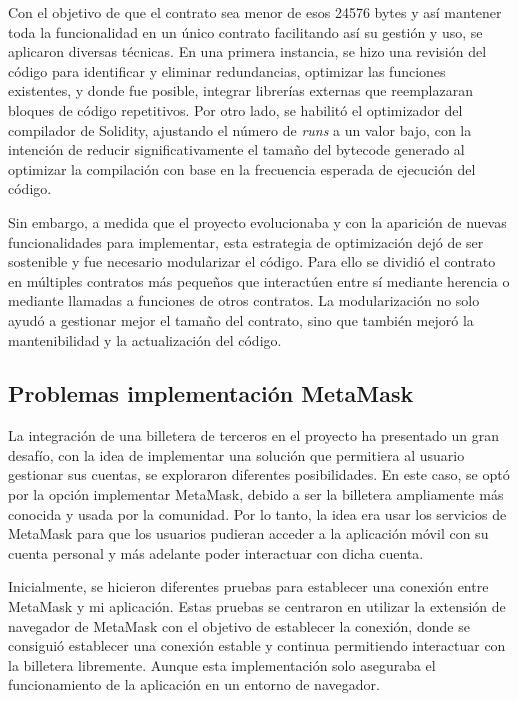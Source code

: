 Con el objetivo de que el contrato sea menor de esos 24576 bytes y así mantener toda la funcionalidad en un único contrato facilitando así su gestión y uso, se aplicaron diversas técnicas.
En una primera instancia, se hizo una revisión del código para identificar y eliminar redundancias, optimizar las funciones existentes, y donde fue posible, integrar librerías externas que reemplazaran bloques de código repetitivos.
Por otro lado, se habilitó el optimizador del compilador de Solidity, ajustando el número de \textit{runs} a un valor bajo, con la intención de reducir significativamente el tamaño del bytecode generado al optimizar la compilación con base en la frecuencia esperada de ejecución del código.

Sin embargo, a medida que el proyecto evolucionaba y con la aparición de nuevas funcionalidades para implementar, esta estrategia de optimización dejó de ser sostenible y fue necesario modularizar el código. 
Para ello se dividió el contrato en múltiples contratos más pequeños que interactúen entre sí mediante herencia o mediante llamadas a funciones de otros contratos.
La modularización no solo ayudó a gestionar mejor el tamaño del contrato, sino que también mejoró la mantenibilidad y la actualización del código.



\subsection{Problemas implementación MetaMask}

La integración de una billetera de terceros en el proyecto ha presentado un gran desafío, con la idea de implementar una solución que permitiera al usuario gestionar sus cuentas, se exploraron diferentes posibilidades.
En este caso, se optó por la opción implementar MetaMask, debido a ser la billetera ampliamente más conocida y usada por la comunidad. 
Por lo tanto, la idea era usar los servicios de MetaMask para que los usuarios pudieran acceder a la aplicación móvil con su cuenta personal y más adelante poder interactuar con dicha cuenta.

Inicialmente, se hicieron diferentes pruebas para establecer una conexión entre MetaMask y mi aplicación. Estas pruebas se centraron en utilizar la extensión de navegador de MetaMask con el objetivo de establecer la conexión, donde se consiguió establecer una conexión estable y continua permitiendo interactuar con la billetera libremente. Aunque esta implementación solo aseguraba el funcionamiento de la aplicación en un entorno de navegador.

